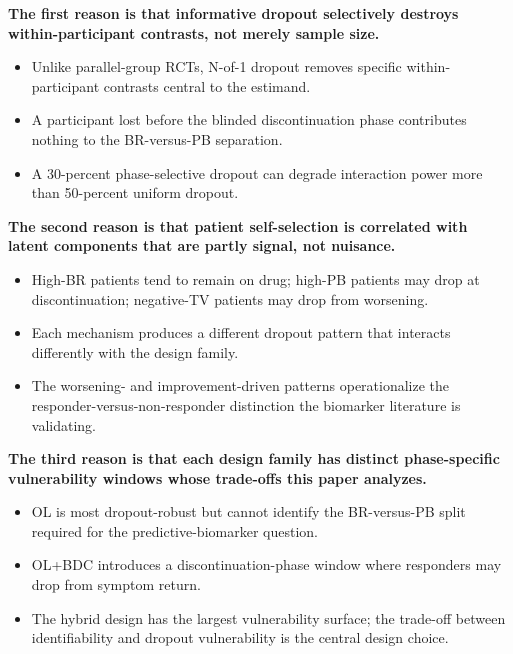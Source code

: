 \documentclass[
  11pt,
]{article}
\begin{document}
\textbf{The first reason is that informative dropout selectively destroys within-participant contrasts, not merely sample size.}

\begin{itemize}\setlength{\itemsep}{2pt}\setlength{\parskip}{0pt}
\item Unlike parallel-group RCTs, N-of-1 dropout removes specific within-participant contrasts central to the estimand.
\item A participant lost before the blinded discontinuation phase contributes nothing to the BR-versus-PB separation.
\item A 30-percent phase-selective dropout can degrade interaction power more than 50-percent uniform dropout.
\end{itemize}

\textbf{The second reason is that patient self-selection is correlated with latent components that are partly signal, not nuisance.}

\begin{itemize}\setlength{\itemsep}{2pt}\setlength{\parskip}{0pt}
\item High-BR patients tend to remain on drug; high-PB patients may drop at discontinuation; negative-TV patients may drop from worsening.
\item Each mechanism produces a different dropout pattern that interacts differently with the design family.
\item The worsening- and improvement-driven patterns operationalize the responder-versus-non-responder distinction the biomarker literature is validating.
\end{itemize}

\textbf{The third reason is that each design family has distinct phase-specific vulnerability windows whose trade-offs this paper analyzes.}

\begin{itemize}\setlength{\itemsep}{2pt}\setlength{\parskip}{0pt}
\item OL is most dropout-robust but cannot identify the BR-versus-PB split required for the predictive-biomarker question.
\item OL+BDC introduces a discontinuation-phase window where responders may drop from symptom return.
\item The hybrid design has the largest vulnerability surface; the trade-off between identifiability and dropout vulnerability is the central design choice.
\end{itemize}
\end{document}
